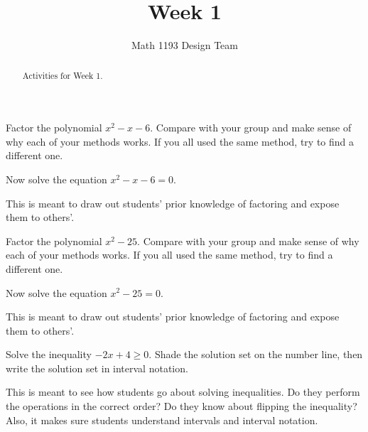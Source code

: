 \documentclass[noauthor,noinstructornotes]{ximera}
\title{Week 1}
\author{Math 1193 Design Team}
\begin{document}
\begin{abstract}
    Activities for Week 1.
\end{abstract}
\maketitle

\begin{problem}
    Factor the polynomial \(x^2 - x - 6\). Compare with 
your group and make sense of why each of your methods
works. If you all used the same method, try to find
a different one.

Now solve the equation \(x^2 - x - 6 = 0\).

\begin{instructorNotes}
This is meant to draw out students' prior knowledge of factoring and expose them to others'.
\end{instructorNotes}
\end{problem}

\begin{problem}
Factor the polynomial \(x^2 - 25\). Compare with 
your group and make sense of why each of your methods
works. If you all used the same method, try to find
a different one.

Now solve the equation \(x^2 - 25 = 0\).

\begin{instructorNotes}
This is meant to draw out students' prior knowledge of factoring and expose them to others'.
\end{instructorNotes}
\end{problem}

\begin{problem}
Solve the inequality \(-2x + 4 \ge 0\). Shade the 
solution set on the number line, then write the 
solution set in interval notation.

\begin{instructorNotes}
This is meant to see how students go about solving inequalities. 
Do they perform the operations in the correct order? Do they know 
about flipping the inequality? Also, it makes sure students understand 
intervals and interval notation.
\end{instructorNotes}
\end{problem}
\end{document}
